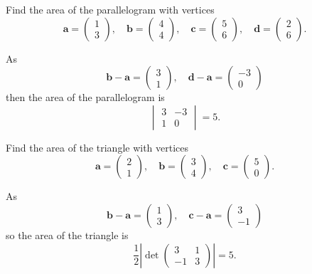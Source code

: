\begin{example}
    Find the area of the parallelogram with vertices
    \[
        \bm a=
        \begin{pmatrix}
            1\\3
        \end{pmatrix}
        ,\quad\bm b=
        \begin{pmatrix}
            4\\4
        \end{pmatrix}
        ,\quad\bm c=
        \begin{pmatrix}
            5\\6
        \end{pmatrix}
        ,\quad\bm d=
        \begin{pmatrix}
            2\\6
        \end{pmatrix}
        .
    \]
    
    As 
    \[
        \bm b-\bm a=
        \begin{pmatrix}
            3\\1
        \end{pmatrix}
        ,\quad\bm d-\bm a=
        \begin{pmatrix}
            -3\\0
        \end{pmatrix}
    \]
    then the area of the parallelogram is
    \[
        \begin{vmatrix}
            3&-3\\1&0
        \end{vmatrix}
        =5.
    \]
\end{example}

\begin{example}
    Find the area of the triangle with vertices 
    \[
        \bm a=
        \begin{pmatrix}
            2\\1
        \end{pmatrix}
        ,\quad\bm b=
        \begin{pmatrix}
            3\\4
        \end{pmatrix}
        ,\quad\bm c=
        \begin{pmatrix}
            5\\0
        \end{pmatrix}
        .
    \]
    
    As 
    \[
        \bm b-\bm a=
        \begin{pmatrix}
            1\\3
        \end{pmatrix}
        ,\quad\bm c-\bm a=
        \begin{pmatrix}
            3\\-1
        \end{pmatrix}
    \]
    so the area of the triangle is
    \[
        \dfrac12\left|\det{
            \begin{pmatrix}
                3&1\\-1&3
            \end{pmatrix}
        }\right|=5.
    \]
\end{example}

